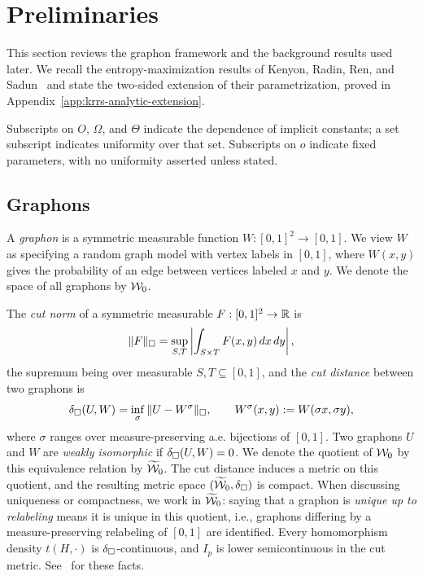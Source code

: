 \section{Preliminaries}\label{sec:preliminaries}

This section reviews the graphon framework and the background results used
later.  We recall the entropy-maximization results of Kenyon, Radin, Ren,
and Sadun~\cite{kenyon2014entropy} and state the two-sided extension of their
parametrization, proved in Appendix~\ref{app:krrs-analytic-extension}.

Subscripts on $O$, $\Omega$, and $\Theta$ indicate the dependence of
implicit constants; a set subscript indicates uniformity over that set.
Subscripts on $o$ indicate fixed parameters, with no uniformity asserted
unless stated.

\subsection{Graphons}\label{sec:graphons}

A \emph{graphon} is a symmetric measurable function
$W:[0,1]^2\to[0,1]$.  We view $W$ as specifying a random graph model with
vertex labels in $[0,1]$, where $W(x,y)$ gives the probability of an edge
between vertices labeled $x$ and $y$.  We denote the space of all graphons
by $\mathcal W_0$.

The \emph{cut norm} of a symmetric measurable
$F:[0,1]^2\to\mathbb R$ is
\[
  \|F\|_\square
  =\sup_{S,T}\left|\int_{S\times T}F(x,y)\,d x\,d y\right|,
\]
the supremum being over measurable $S,T\subseteq[0,1]$, and the \emph{cut
distance} between two graphons is
\[
  \delta_\square(U,W)=\inf_\sigma\|U-W^\sigma\|_\square,
  \qquad
  W^\sigma(x,y):=W(\sigma x,\sigma y),
\]
where $\sigma$ ranges over measure-preserving a.e. bijections of $[0,1]$.
Two graphons $U$ and $W$ are \emph{weakly isomorphic} if
$\delta_\square(U,W)=0$.  We denote the quotient of $\mathcal W_0$ by this equivalence
relation by $\widetilde{\mathcal W}_0$.  The cut distance induces a metric on this
quotient, and the resulting metric space $(\widetilde{\mathcal W}_0,\delta_\square)$
is compact.  When discussing uniqueness or compactness, we work in
$\widetilde{\mathcal W}_0$: saying that a graphon is \emph{unique up to relabeling} means it is unique in this
quotient, i.e., graphons differing by a measure-preserving
relabeling of $[0,1]$ are identified.  Every homomorphism density
$t(H,\cdot)$ is $\delta_\square$-continuous, and $I_p$ is lower semicontinuous
in the cut metric.  See~\cite{LovaszGraphLimits} for these facts.

